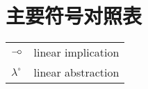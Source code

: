 
\chapter{主要符号对照表}
\label{chap:symb}
\begin{tabular}{ll}

 \hspace{2em}$\mathbin{{-}\mkern-3.5mu{\circ}}$       & \hspace{5em}linear implication \\
 \hspace{2em}$\lambda^{\circ}$ & \hspace{5em}linear abstraction \\

\end{tabular}
